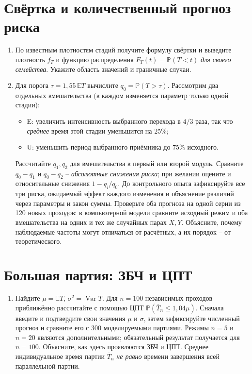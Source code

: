 \documentclass[12pt,a4paper]{article}
\begin{document}
\section{Свёртка и количественный прогноз риска}
\begin{enumerate}[resume]
\item По известным плотностям стадий получите формулу свёртки и выведите плотность \(f_T\) и функцию распределения \(F_T(t)=\mathbb P(T<t)\) \emph{для своего семейства}. Укажите область значений и граничные случаи.
\item Для порога \(\tau=1{,}55\,\mathbb E T\) вычислите \(q_0=\mathbb P(T>\tau)\). Рассмотрим два отдельных вмешательства (в каждом изменяется параметр только одной стадии):
\begin{itemize}
\item E: увеличить интенсивность выбранного перехода в \(4/3\) раза, так что \emph{среднее} время этой стадии уменьшится на 25\%;
\item U: уменьшить период выбранного приёмника до 75\% исходного.
\end{itemize}
Рассчитайте \(q_1,q_2\) для вмешательства в первый или второй модуль. Сравните \(q_0-q_1\) и \(q_0-q_2\) – \emph{абсолютные снижения риска}; при желании оцените и относительные снижения \(1-q_i/q_0\). До контрольного опыта зафиксируйте все три риска, ожидаемый эффект каждого изменения и объяснение различий через параметры и закон суммы. Проверьте оба прогноза на одной серии из 120 новых проходов: в компьютерной модели сравните исходный режим и оба вмешательства на одних и тех же случайных парах \(X,Y\). Объясните, почему наблюдаемые частоты могут отличаться от расчётных, а их порядок – от теоретического.
\end{enumerate}

\section{Большая партия: ЗБЧ и ЦПТ}
\begin{enumerate}[resume]
\item Найдите \(\mu=\mathbb E T\), \(\sigma^2=\operatorname{Var}T\). Для \(n=100\) независимых проходов приближённо рассчитайте с помощью ЦПТ \(\mathbb P(\overline T_n\le 1{,}04\mu)\). Сначала введите и подтвердите свои значения $\mu$ и $\sigma$, затем зафиксируйте численный прогноз и сравните его с 300 моделируемыми партиями. Режимы $n=5$ и $n=20$ являются дополнительными; обязательный результат получается для $n=100$. Объясните, как здесь проявляются ЗБЧ и ЦПТ. Среднее индивидуальное время партии \(\overline T_n\) \emph{не равно} времени завершения всей параллельной партии.
\end{enumerate}
\end{document}
